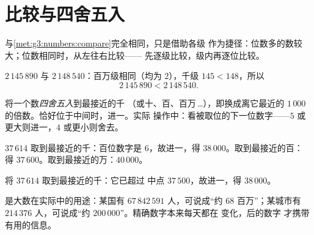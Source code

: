 \section{比较与四舍五入}

\begin{method}[比较大数]\label{met:g4:numbers:compare}
与\cref{met:g3:numbers:compare}完全相同，只是借助各级
作为捷径：位数多的数较大；位数相同时，从左往右比较——
先逐级比较，级内再逐位比较。
\end{method}

\begin{example}\label{ex:g4:numbers:compare}
$2\,145\,890$ 与 $2\,148\,540$：百万级相同（均为 $2$），千级
$145 < 148$，所以
\[
2\,145\,890 < 2\,148\,540 .
\]
\end{example}

\begin{definition}[四舍五入]\label{def:g4:numbers:round}
将一个数\emph{四舍五入}到最接近的千
（或十、百、百万\,\dots），即换成离它最近的
$1\,000$ 的倍数。恰好位于中间时，进一。实际
操作中：看被取位的下一位数字——$5$ 或
更大则进一，$4$ 或更小则舍去。
\end{definition}

\begin{example}\label{ex:g4:numbers:round}
$37\,614$ 取到最接近的千：百位数字是
$6$，故进一，得 $38\,000$。取到最接近的百：
得 $37\,600$。取到最接近的万：$40\,000$。
\end{example}

\begin{omfigure}

{\small 将 $37\,614$ 取到最接近的千：它已超过
中点 $37\,500$，故进一，得 $38\,000$。}
\end{omfigure}

\begin{example}[世界中的数量级]\label{ex:g4:numbers:world}
是大数在实际中的用途：某国有
$67\,842\,591$ 人，可说成“约 $68$ 百万”；某城市有
$214\,376$ 人，可说成“约 $200\,000$”。精确数字本来每天都在
变化，后的数字
才携带有用的信息。
\end{example}

